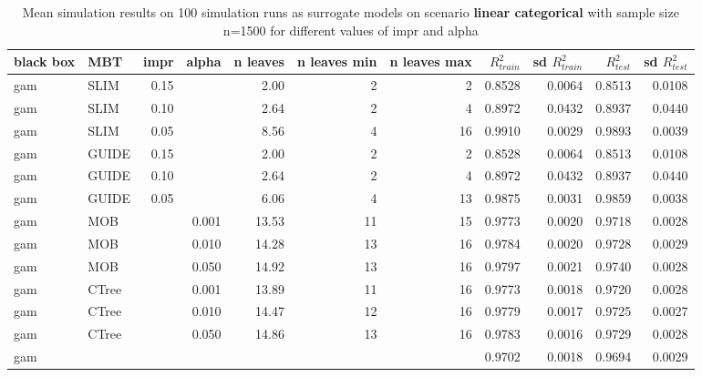 \begin{table}[!htb]
\begin{tabular}[t]{l|l|r|r|r|r|r|r|r|r|r}
\hline
\end{tabular}
\label{tab:app_linear_smooth_5000}

\end{table}



\begin{table}[!htb]

\caption{Mean simulation results on 100 simulation runs as surrogate models  on scenario \textbf{linear categorical} with sample size n=1500 for different values of impr and alpha}
\centering \tiny
\begin{tabular}[t]{l|l|r|r|r|r|r|r|r|r|r}
\hline
black box & MBT & impr & alpha & n leaves & n leaves min & n leaves max &  $R^2_{train}$ & sd $R^2_{train}$ & $R^2_{test}$ & sd $R^2_{test}$\\
\hline
gam & SLIM & 0.15 & & 2.00 & 2 & 2 & 0.8528 & 0.0064 & 0.8513 & 0.0108\\
gam & SLIM & 0.10 & & 2.64 & 2 & 4 & 0.8972 & 0.0432 & 0.8937 & 0.0440\\
gam & SLIM & 0.05 & & 8.56 & 4 & 16 & 0.9910 & 0.0029 & 0.9893 & 0.0039\\
gam & GUIDE & 0.15 & & 2.00 & 2 & 2 & 0.8528 & 0.0064 & 0.8513 & 0.0108\\
gam & GUIDE & 0.10 & & 2.64 & 2 & 4 & 0.8972 & 0.0432 & 0.8937 & 0.0440\\
gam & GUIDE & 0.05 & & 6.06 & 4 & 13 & 0.9875 & 0.0031 & 0.9859 & 0.0038\\
gam & MOB & & 0.001 & 13.53 & 11 & 15 & 0.9773 & 0.0020 & 0.9718 & 0.0028\\
gam & MOB & & 0.010 & 14.28 & 13 & 16 & 0.9784 & 0.0020 & 0.9728 & 0.0029\\
gam & MOB & & 0.050 & 14.92 & 13 & 16 & 0.9797 & 0.0021 & 0.9740 & 0.0028\\
gam & CTree & & 0.001 & 13.89 & 11 & 16 & 0.9773 & 0.0018 & 0.9720 & 0.0028\\
gam & CTree & & 0.010 & 14.47 & 12 & 16 & 0.9779 & 0.0017 & 0.9725 & 0.0027\\
gam & CTree & & 0.050 & 14.86 & 13 & 16 & 0.9783 & 0.0016 & 0.9729 & 0.0028\\
\hline
gam & & & & & & & 0.9702 & 0.0018 & 0.9694 & 0.0029\\
\hline


\end{tabular}
\end{table}
